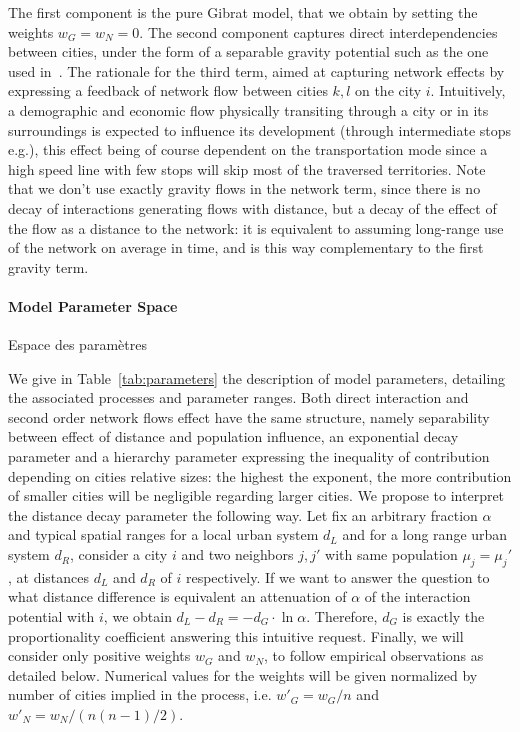 The first component is the pure Gibrat model, that we obtain by setting the weights $w_G = w_N = 0$. The second component captures direct interdependencies between cities, under the form of a separable gravity potential such as the one used in~\cite{sanders1992systeme}. The rationale for the third term, aimed at capturing network effects by expressing a feedback of network flow between cities $k,l$ on the city $i$. Intuitively, a demographic and economic flow physically transiting through a city or in its surroundings is expected to influence its development (through intermediate stops e.g.), this effect being of course dependent on the transportation mode since a high speed line with few stops will skip most of the traversed territories. Note that we don't use exactly gravity flows in the network term, since there is no decay of interactions generating flows with distance, but a decay of the effect of the flow as a distance to the network: it is equivalent to assuming long-range use of the network on average in time, and is this way complementary to the first gravity term.


\paragraph{Model Parameter Space}{Espace des paramètres}

We give in Table~\ref{tab:parameters} the description of model parameters, detailing the associated processes and parameter ranges. Both direct interaction and second order network flows effect have the same structure, namely separability between effect of distance and population influence, an exponential decay parameter and a hierarchy parameter expressing the inequality of contribution depending on cities relative sizes: the highest the exponent, the more contribution of smaller cities will be negligible regarding larger cities. We propose to interpret the distance decay parameter the following way. Let fix an arbitrary fraction $\alpha$ and typical spatial ranges for a local urban system $d_L$ and for a long range urban system $d_R$, consider a city $i$ and two neighbors $j,j'$ with same population $\mu_j=\mu_j'$, at distances $d_L$ and $d_R$ of $i$ respectively. If we want to answer the question to what distance difference is equivalent an attenuation of $\alpha$ of the interaction potential with $i$, we obtain $d_L - d_R = -d_G\cdot \ln \alpha$. Therefore, $d_G$ is exactly the proportionality coefficient answering this intuitive request. Finally, we will consider only positive weights $w_G$ and $w_N$, to follow empirical observations as detailed below. Numerical values for the weights will be given normalized by number of cities implied in the process, i.e. ${w'}_G = w_G / n$ and ${w'}_N = w_N / (n (n-1) / 2)$.



